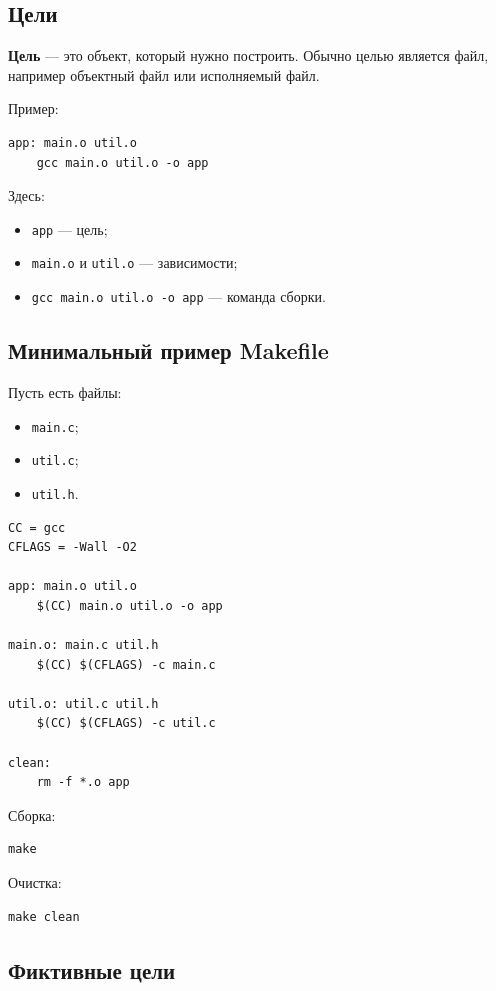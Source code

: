 \documentclass[12pt,a4paper]{article}
\begin{document}
\subsection{Цели}

\textbf{Цель} --- это объект, который нужно построить. Обычно целью является файл, например объектный файл или исполняемый файл.

Пример:

\begin{lstlisting}
app: main.o util.o
	gcc main.o util.o -o app
\end{lstlisting}

Здесь:
\begin{itemize}
    \item \texttt{app} --- цель;
    \item \texttt{main.o} и \texttt{util.o} --- зависимости;
    \item \texttt{gcc main.o util.o -o app} --- команда сборки.
\end{itemize}

\subsection{Минимальный пример Makefile}

Пусть есть файлы:
\begin{itemize}
    \item \texttt{main.c};
    \item \texttt{util.c};
    \item \texttt{util.h}.
\end{itemize}

\begin{lstlisting}
CC = gcc
CFLAGS = -Wall -O2

app: main.o util.o
	$(CC) main.o util.o -o app

main.o: main.c util.h
	$(CC) $(CFLAGS) -c main.c

util.o: util.c util.h
	$(CC) $(CFLAGS) -c util.c

clean:
	rm -f *.o app
\end{lstlisting}

Сборка:
\begin{lstlisting}
make
\end{lstlisting}

Очистка:
\begin{lstlisting}
make clean
\end{lstlisting}

\subsection{Фиктивные цели}
\end{document}
